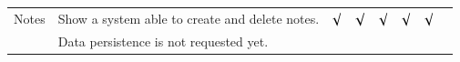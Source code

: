 \begin{table}[htb]
\begin{center}
\begin{tabular}{|l|l|l|l|l|l|l|l|}
Notes   & Show a system able to create and delete notes.    &$\surd$&$\surd$&$\surd$&$\surd$&$\surd$\\
        & Data persistence is not requested yet.            &       &       &       &       &     \\\hline
        \end{tabular}
    \end{center}
\end{table}




